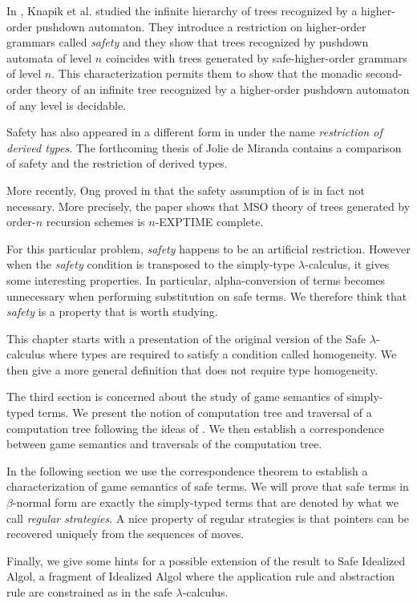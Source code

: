 
In \cite{KNU02}, Knapik et al. studied the infinite hierarchy of
trees recognized by a higher-order pushdown automaton. They
introduce a restriction on higher-order grammars called
\emph{safety} and they show that trees recognized by pushdown
automata of level $n$ coincides with trees generated by
safe-higher-order grammars of level $n$. This characterization
permits them to show that the monadic second-order theory of an
infinite tree recognized by a higher-order pushdown automaton of any
level is decidable.

Safety has also appeared in a different form in \cite{Dam82} under
the name \emph{restriction of derived types}. The forthcoming thesis
of Jolie de Miranda \citep{demirandathesis} contains a comparison of
safety and the restriction of derived types.

More recently, Ong proved in \cite{OngLics2006} that the safety
assumption of \cite{KNU02} is in fact not necessary. More precisely,
the paper shows that MSO theory of trees generated by order-$n$
recursion schemes is $n$-EXPTIME complete.

For this particular problem, \emph{safety} happens to be an
artificial restriction. However when the \emph{safety} condition is
transposed to the simply-type $\lambda$-calculus, it gives some
interesting properties. In particular, alpha-conversion of terms
becomes unnecessary when performing substitution on safe terms. We
therefore think that \emph{safety} is a property that is worth
studying.

This chapter starts with a presentation of the original version of
the Safe $\lambda$-calculus where types are required to satisfy a
condition called homogeneity. We then give a more general definition
that does not require type homogeneity.

The third section is concerned about the study of game semantics of
simply-typed terms. We present the notion of computation tree and
traversal of a computation tree following the ideas of
\cite{OngLics2006}. We then establish a correspondence between game
semantics and traversals of the computation tree.

In the following section we use the correspondence theorem to
establish a characterization of game semantics of safe terms. We
will prove that safe terms in $\beta$-normal form are exactly the
simply-typed terms that are denoted by what we call \emph{regular
strategies}. A nice property of regular strategies is that pointers
can be recovered uniquely from the sequences of moves.

Finally, we give some hints for a possible extension of the result
to Safe Idealized Algol, a fragment of Idealized Algol where the
application rule and abstraction rule are constrained as in the safe
$\lambda$-calculus.
